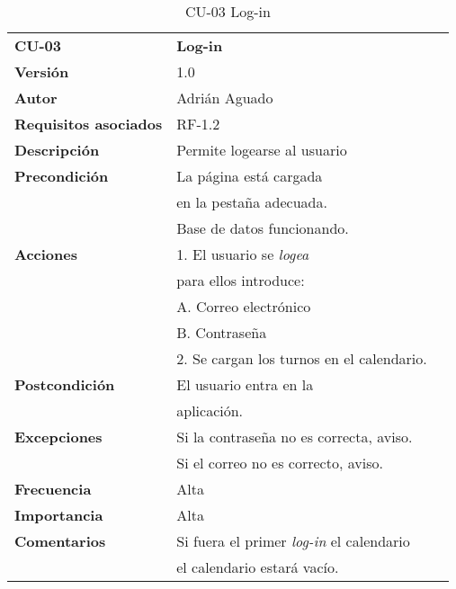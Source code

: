 \begin{table}
\begin{tabular}{llr}  
\toprule
\begin{minipage}[b]{0.24\columnwidth}\raggedright\strut
\textbf{CU-03}\strut
\end{minipage} & \begin{minipage}[b]{0.72\columnwidth}\raggedright\strut
\textbf{Log-in}\strut
\end{minipage}\tabularnewline
\cmidrule(r){1-2}
\textbf{Versión}       & 1.0           \\
\textbf{Autor}       & Adrián  Aguado    \\
\textbf{Requisitos asociados}       & RF-1.2 \\ 
\textbf{Descripción} & Permite logearse al usuario\\
\textbf{Precondición} & La página está cargada \\
& en la pestaña adecuada.     \\
& Base de datos funcionando.       \\
\textbf{Acciones} & 1. El usuario se \emph{logea}\\
& para ellos introduce:\\
& A. Correo electrónico \\
& B. Contraseña\\
& 2. Se cargan los turnos en el calendario.\\
\textbf{Postcondición} & El usuario entra en la  \\
& aplicación.    \\
\textbf{Excepciones} &  Si la contraseña no es correcta, aviso. \\
&  Si el correo no es correcto, aviso. \\
\textbf{Frecuencia} & Alta            \\
\textbf{Importancia} & Alta            \\
\textbf{Comentarios } &  Si fuera el primer \emph{log-in} el calendario   \\
& el calendario estará vacío.\\
\bottomrule
\end{tabular}
\caption{CU-03 Log-in} 
\end{table}


